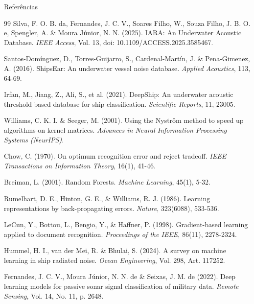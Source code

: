 \documentclass{beamer}
\begin{document}
\begin{frame}[allowframebreaks]{Referências}
    \tiny
    \begin{thebibliography}{99}
        Silva, F. O. B. da, Fernandes, J. C. V., Soares Filho, W., Souza Filho, J. B. O. e, Spengler, A. \& Moura Júnior, N. N. (2025). IARA: An Underwater Acoustic Database. \textit{IEEE Access}, Vol. 13, doi: 10.1109/ACCESS.2025.3585467.
        
        Santos-Domínguez, D., Torres-Guijarro, S., Cardenal-Martín, J. \& Pena-Gimenez, A. (2016). ShipsEar: An underwater vessel noise database. \textit{Applied Acoustics}, 113, 64-69.
        
        Irfan, M., Jiang, Z., Ali, S., et al. (2021). DeepShip: An underwater acoustic threshold-based database for ship classification. \textit{Scientific Reports}, 11, 23005.
        
        Williams, C. K. I. \& Seeger, M. (2001). Using the Nyström method to speed up algorithms on kernel matrices. \textit{Advances in Neural Information Processing Systems (NeurIPS)}.
        
        Chow, C. (1970). On optimum recognition error and reject tradeoff. \textit{IEEE Transactions on Information Theory}, 16(1), 41-46.

        Breiman, L. (2001). Random Forests. \textit{Machine Learning}, 45(1), 5-32.

        Rumelhart, D. E., Hinton, G. E., \& Williams, R. J. (1986). Learning representations by back-propagating errors. \textit{Nature}, 323(6088), 533-536.

        LeCun, Y., Bottou, L., Bengio, Y., \& Haffner, P. (1998). Gradient-based learning applied to document recognition. \textit{Proceedings of the IEEE}, 86(11), 2278-2324.

        Hummel, H. I., van der Mei, R. \& Bhulai, S. (2024). A survey on machine learning in ship radiated noise. \textit{Ocean Engineering}, Vol. 298, Art. 117252.

        Fernandes, J. C. V., Moura Júnior, N. N. de \& Seixas, J. M. de (2022). Deep learning models for passive sonar signal classification of military data. \textit{Remote Sensing}, Vol. 14, No. 11, p. 2648.


\end{thebibliography}
\end{frame}
\end{document}
